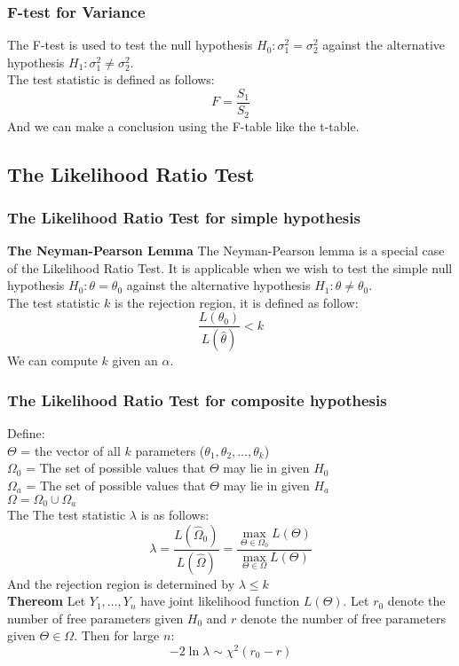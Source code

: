 \documentclass[sn-mathphys,Numbered]{sn-jnl}%
\newcommand{\Theorem}{\textbf{Thereom }}
\begin{document}
\subsubsection{F-test for Variance}\label{f-test}
The F-test is used to test the null hypothesis $H_0: \sigma_1^2 = \sigma_2^2$
against the alternative hypothesis $H_1: \sigma_1^2 \neq \sigma_2^2$.\\ The
test statistic is defined as follows:
\begin{equation}
    F = \frac{S_1}{S_2}
\end{equation}
And we can make a conclusion using the F-table like the t-table.

\subsection{The Likelihood Ratio Test}\label{likelihood-ratio}
\subsubsection{The Likelihood Ratio Test for simple hypothesis}\label{likelihood-ratio-simple}
\textbf{The Neyman-Pearson Lemma}
The Neyman-Pearson lemma is a special case of the Likelihood Ratio Test. It is applicable when we wish to test the simple null hypothesis $H_0: \theta = \theta_0$ against the alternative hypothesis $H_1: \theta \neq \theta_0$.\\
The test statistic $k$ is the rejection region, it is defined as follow:
\begin{equation}
    \frac{L(\theta_0)}{L(\hat \theta)} < k
\end{equation}
We can compute $k$ given an $\alpha$.
\subsubsection{The Likelihood Ratio Test for composite hypothesis}\label{likelihood-ratio-composite}
Define: \\ $\Theta$ = the vector of all $k$ parameters ($\theta_1, \theta_2,
    \dots, \theta_k$)\\ $\Omega_0$ = The set of possible values that $\Theta$ may
lie in given $H_0$ \\ $\Omega_a$ = The set of possible values that $\Theta$ may
lie in given $H_a$ \\ $\Omega = \Omega_0 \cup \Omega_a$ \\The The test
statistic $\lambda$ is as follows:
\begin{equation}
    \lambda = \frac{L(\hat \Omega_0)}{L(\hat \Omega)} = \frac{\max_{\Theta \in \Omega_0}L(\Theta)}{\max_{\Theta \in \Omega} L(\Theta)}
\end{equation}
And the rejection region is determined by $\lambda \le k$
\\\Theorem Let $Y_1, \dots, Y_n$ have joint likelihood function $L(\Theta)$. Let $r_0$ denote the number of free parameters given $H_0$ and $r$ denote the number of free parameters given $\Theta \in \Omega$. Then for large $n$:
\begin{equation}
    -2 \ln \lambda \sim \chi^2(r_0-r)
\end{equation}
\end{document}
